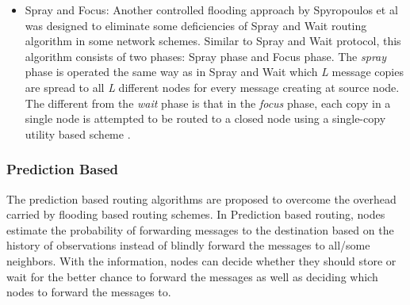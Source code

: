 \begin{itemize}
\begin{itemize}
		\item Spray and Focus: Another controlled flooding approach by Spyropoulos et al \cite{Spyropoulos2007} was designed to eliminate some deficiencies of Spray and Wait routing algorithm in some network schemes.
		Similar to Spray and Wait protocol, this algorithm consists of two phases: Spray phase and Focus phase.
		The \emph{spray} phase is operated the same way as in Spray and Wait which \emph{L} message copies are spread to all \emph{L} different nodes for every message creating at source node.
		The different from the \emph{wait} phase is that in the \emph{focus} phase, each copy in a single node is attempted to be routed to a closed node using a single-copy utility based scheme \cite{Spyropoulos2008}.
	 
	\end{itemize}
\end{itemize}


\subsubsection{Prediction Based}
The prediction based routing algorithms are proposed to overcome the overhead carried by flooding based routing schemes. In Prediction based routing, nodes estimate the probability of forwarding messages to the destination based on the history of observations instead of blindly forward the messages to all/some neighbors. 
With the information, nodes can decide whether they should store or wait for the better chance to forward the messages as well as deciding which nodes to forward the messages to.

